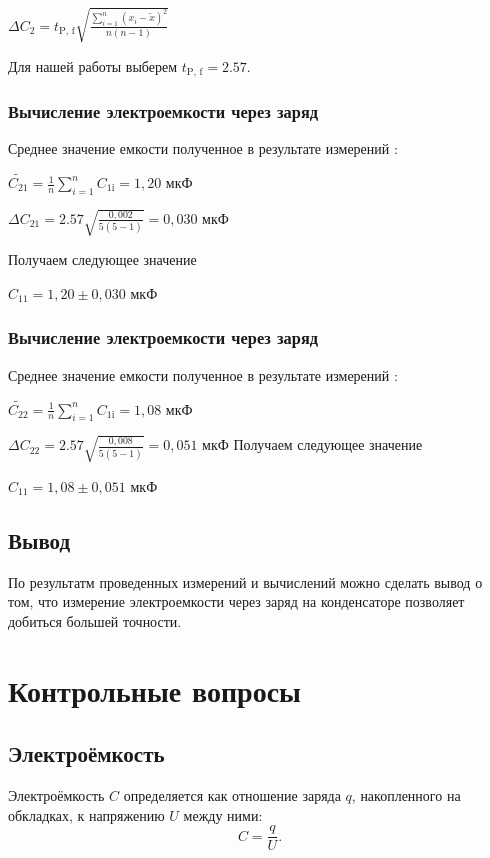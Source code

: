 \documentclass[14pt, a4paper, twoside]{extreport}
\begin{document}
$\Delta C_2 = t_\text{P, f} \sqrt{\frac{\sum_{i=1}^{n} (x_i - \tilde{x})^2}{n(n-1)}}$

Для нашей работы выберем $t_\text{P, f} = 2.57 $.

\subsection{Вычисление электроемкости через заряд }
Среднее значение емкости полученное в результате измерений :

$ \tilde{C_{21}} = \frac{1}{n}\sum_{i=1}^{n} C_\text{1i} = 1,20 \text{ мкФ} $

$\Delta C_{21} = 2.57 \sqrt{\frac{0,002}{5(5-1)}} = 0,030 \text{ мкФ}$

Получаем следующее значение
\begin{center}
  $C_{11} = 1,20 \pm 0,030 \text{ мкФ}$
\end{center}

\subsection{Вычисление электроемкости через заряд }

Среднее значение емкости полученное в результате измерений :

$ \tilde{C_{22}} = \frac{1}{n}\sum_{i=1}^{n} C_\text{1i} = 1,08 \text{ мкФ} $

$\Delta C_{22} = 2.57 \sqrt{\frac{0,008}{5(5-1)}} = 0,051 \text{ мкФ}$
Получаем следующее значение
\begin{center}
  $C_{11} = 1,08 \pm 0,051 \text{ мкФ}$
\end{center}
\section{Вывод}

По результатм проведенных измерений и вычислений можно сделать вывод о том, что измерение электроемкости через заряд на конденсаторе позволяет добиться большей точности.
\chapter{Контрольные вопросы}
\section{Электроёмкость}
Электроёмкость $C$ определяется как отношение заряда $q$, накопленного на обкладках, к напряжению $U$ между ними:
\[
  C = \frac{q}{U}.
\]
\end{document}
